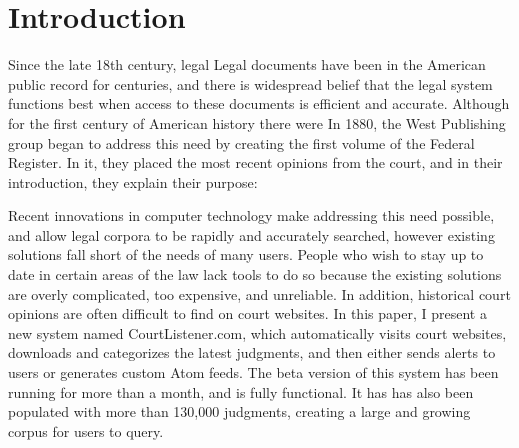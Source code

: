 \section{Introduction}
Since the late 18th century, legal Legal documents have been in the American public record for centuries, and there is widespread belief that the legal system functions best when access to these documents is efficient and accurate. 
Although for the first century of American history there were In 1880, the West Publishing group began to address this need by creating the first volume of the Federal Register. In it, they placed the most recent opinions from the court, and in their introduction, they explain their purpose:
\begin{quote}
\end{quote}
Recent innovations in computer technology make addressing this need possible, and allow legal corpora to be rapidly and accurately searched, however existing solutions fall short of the needs of many users.
People who wish to stay up to date in certain areas of the law lack tools to do so because the existing solutions are overly complicated, too expensive, and unreliable. 
In addition, historical court opinions are often difficult to find on court websites. In this paper, I present a new system named CourtListener.com, which automatically visits court websites, downloads and categorizes the latest judgments, and then either sends alerts to users or generates custom Atom feeds. The beta version of this system has been running for more than a month, and is fully functional. It has has also been populated with more than 130,000 judgments, creating a large and growing corpus for users to query.



